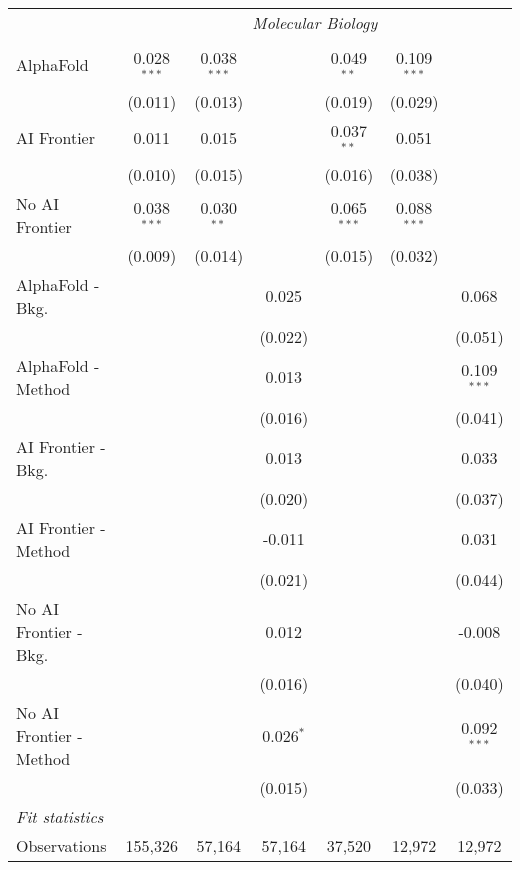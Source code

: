 \begin{tabular}{lcccccc}
 & \multicolumn{6}{c}{\textit{Molecular Biology}} \\ \\
   AlphaFold               & 0.028$^{***}$ & 0.038$^{***}$ &             & 0.049$^{**}$  & 0.109$^{***}$ &   \\   
                           & (0.011)       & (0.013)       &             & (0.019)       & (0.029)       &   \\   
   AI Frontier             & 0.011         & 0.015         &             & 0.037$^{**}$  & 0.051         &   \\   
                           & (0.010)       & (0.015)       &             & (0.016)       & (0.038)       &   \\   
   No AI Frontier          & 0.038$^{***}$ & 0.030$^{**}$  &             & 0.065$^{***}$ & 0.088$^{***}$ &   \\   
                           & (0.009)       & (0.014)       &             & (0.015)       & (0.032)       &   \\   
   AlphaFold - Bkg.        &               &               & 0.025       &               &               & 0.068\\   
                           &               &               & (0.022)     &               &               & (0.051)\\   
   AlphaFold - Method      &               &               & 0.013       &               &               & 0.109$^{***}$\\   
                           &               &               & (0.016)     &               &               & (0.041)\\   
   AI Frontier - Bkg.      &               &               & 0.013       &               &               & 0.033\\   
                           &               &               & (0.020)     &               &               & (0.037)\\   
   AI Frontier - Method    &               &               & -0.011      &               &               & 0.031\\   
                           &               &               & (0.021)     &               &               & (0.044)\\   
   No AI Frontier - Bkg.   &               &               & 0.012       &               &               & -0.008\\   
                           &               &               & (0.016)     &               &               & (0.040)\\   
   No AI Frontier - Method &               &               & 0.026$^{*}$ &               &               & 0.092$^{***}$\\   
                           &               &               & (0.015)     &               &               & (0.033)\\   
   \midrule
   \emph{Fit statistics}\\
   Observations            & 155,326       & 57,164        & 57,164      & 37,520        & 12,972        & 12,972\\  
   

\end{tabular}
